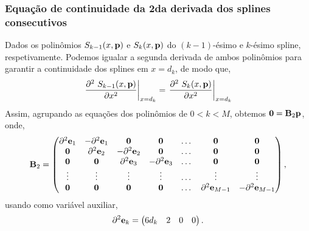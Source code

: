 \subsubsection{Equação de continuidade da 2da derivada dos splines consecutivos}
\label{subsubsec:part2}
Dados os polinômios $S_{k-1}(x,\VECTOR{p})$ e $S_{k}(x,\VECTOR{p})$ do $(k-1)$-ésimo e $k$-ésimo spline,
respetivamente. Podemos igualar a segunda derivada de ambos polinômios para garantir a continuidade dos splines em $x=d_{k}$, 
de modo que,
\begin{equation}
 \left.\frac{\partial^2~S_{k-1}(x,\VECTOR{p})}{\partial x^2}\right|_{x=d_{k}} = 
 \left.\frac{\partial^2~S_{k}  (x,\VECTOR{p})}{\partial x^2}\right|_{x=d_{k}}
\end{equation}
Assim, agrupando as equações dos polinômios de  $0<k<M$, obtemos $\mathbf{0}=\MATRIX{B}_2 \VECTOR{p}$, onde,
\begin{equation}
\MATRIX{B}_2 =\left(\begin{matrix}
\partial^2\VECTOR{e}_1 & -\partial^2\VECTOR{e}_1   & \mathbf{0}    &  \mathbf{0}   & \dots & \mathbf{0} & \mathbf{0}\\
\mathbf{0}   &  \partial^2\VECTOR{e}_2   & -\partial^2\VECTOR{e}_2 &  \mathbf{0}   & \dots & \mathbf{0} & \mathbf{0}\\
\mathbf{0}   &  \mathbf{0}     &  \partial^2\VECTOR{e}_3 & -\partial^2\VECTOR{e}_3 & \dots & \mathbf{0} & \mathbf{0}\\
\vdots       &  \vdots         &  \vdots       &  \vdots       & \dots & \vdots     & \vdots\\
\mathbf{0}   &  \mathbf{0}     &  \mathbf{0}   &  \mathbf{0}   & \dots & \partial^2\VECTOR{e}_{M-1} & -\partial^2\VECTOR{e}_{M-1} \\
\end{matrix}\right),
\end{equation}
usando como variável auxiliar,
\begin{equation}
\partial^2\VECTOR{e}_k =\left(\begin{matrix}
6d_k & 2   & 0 & 0  \\
\end{matrix}\right).
\end{equation}



